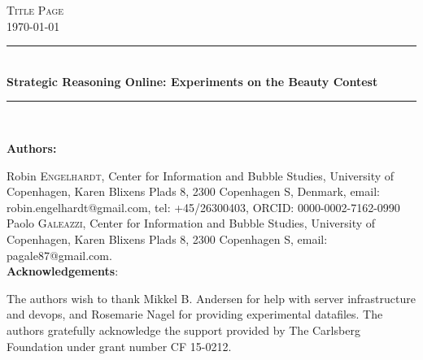 \thispagestyle{empty}
\newcommand{\HRule}{\rule{\linewidth}{0.5mm}} %
	
	
{\center

\textsc{\LARGE Title Page}\\[1cm]
{\large\today} %


\HRule\\[0.4cm]
\huge\bfseries Strategic Reasoning Online: Experiments on the Beauty Contest\\[0.4cm]
\HRule\\[0.4cm]
}


{\center
\large\textbf{Authors:}\\
}

\noindent
Robin \textsc{Engelhardt},  Center for Information and Bubble Studies, University of Copenhagen, Karen Blixens Plads 8, 2300 Copenhagen S, Denmark, email: robin.engelhardt@gmail.com, tel: +45/26300403, ORCID: 0000-0002-7162-0990 \\

\noindent
Paolo \textsc{Galeazzi}, Center for Information and Bubble Studies, University of Copenhagen, Karen Blixens Plads 8, 2300 Copenhagen S,  email:  pagale87@gmail.com.\\
	
{\center
\large\textbf{Acknowledgements}:\\
}

\noindent
The authors wish to thank Mikkel B. Andersen for help with server infrastructure and devops, and Rosemarie Nagel for providing experimental datafiles. The authors gratefully acknowledge the support provided by The Carlsberg Foundation under grant number CF 15-0212.
	

	



